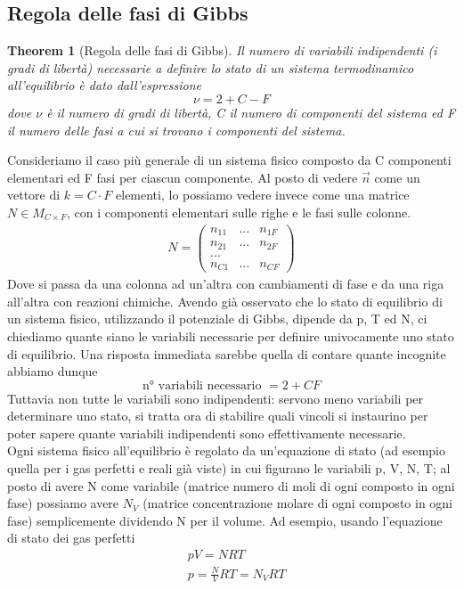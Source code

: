 \documentclass[10pt,a4paper]{article}
\newtheorem{theorem}{Theorem}
\begin{document}
\subsection{Regola delle fasi di Gibbs}
\begin{theorem}[Regola delle fasi di Gibbs]
Il numero di variabili indipendenti (i gradi di libertà) necessarie a definire lo stato di un sistema termodinamico all'equilibrio è dato dall'espressione
\[\nu = 2+C-F\]
dove $\nu$ è il numero di gradi di libertà, C il numero di componenti del sistema ed F il numero delle fasi a cui si trovano i componenti del sistema.
\end{theorem}
Consideriamo il caso più generale di un sistema fisico composto da C componenti elementari ed F fasi per ciascun componente. Al posto di vedere $\vec{n}$ come un vettore di \(k =C\cdot F\) elementi, lo possiamo vedere invece come una matrice \(N\in M_{C\times F}\), con i componenti elementari sulle righe e le fasi sulle colonne.    
\begin{align*}
	N = \begin{pmatrix}
		n_{11}&...&n_{1F}\\
		n_{21}&...&n_{2F}\\
		...&&\\
		n_{C1}&...&n_{CF}
	\end{pmatrix}
\end{align*}
Dove si passa da una colonna ad un'altra con cambiamenti di fase e da una riga all'altra con reazioni chimiche. Avendo già osservato che lo stato di equilibrio di un sistema fisico, utilizzando il potenziale di Gibbs, dipende da p, T ed N, ci chiediamo quante siano le variabili necessarie per definire univocamente uno stato di equilibrio. Una risposta immediata sarebbe quella di contare quante incognite abbiamo dunque 
\[\text{n° variabili necessario }= 2 + CF\]
Tuttavia non tutte le variabili sono indipendenti: servono meno variabili per determinare uno stato, si tratta ora di stabilire quali vincoli si instaurino per poter sapere quante variabili indipendenti sono effettivamente necessarie.\\
Ogni sistema fisico all'equilibrio è regolato da un'equazione di stato (ad esempio quella per i gas perfetti e reali già viste) in cui figurano le variabili p, V, N, T; al posto di avere N come variabile (matrice numero di moli di ogni composto in ogni fase) possiamo avere \(N_V\) (matrice concentrazione molare di ogni composto in ogni fase) semplicemente dividendo N per il volume. Ad esempio, usando l'equazione di stato dei gas perfetti
\begin{align*}
	&pV = NRT\\
	&p = \frac{N}{V} RT = N_V R T
\end{align*}
\end{document}
